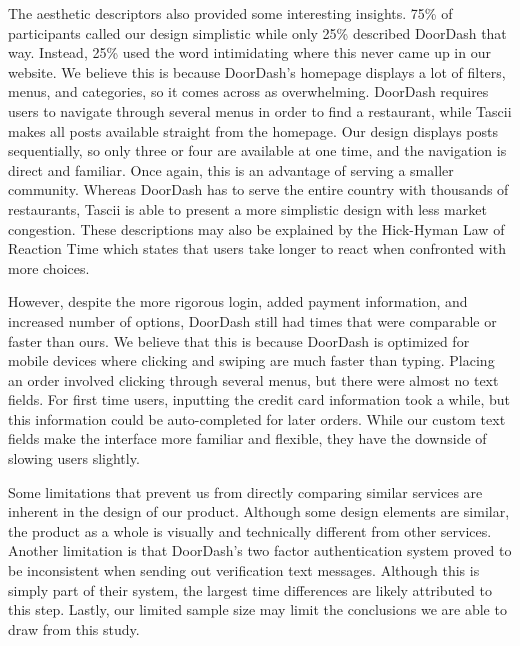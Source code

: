 The aesthetic descriptors also provided some interesting insights. 75\% of participants called our design simplistic while only 25\% described DoorDash that way. Instead, 25\% used the word intimidating where this never came up in our website. We believe this is because DoorDash's homepage displays a lot of filters, menus, and categories, so it comes across as overwhelming. DoorDash requires users to navigate through several menus in order to find a restaurant, while Tascii makes all posts available straight from the homepage. Our design displays posts sequentially, so only three or four are available at one time, and the navigation is direct and familiar. Once again, this is an advantage of serving a smaller community. Whereas DoorDash has to serve the entire country with thousands of restaurants, Tascii is able to present a more simplistic design with less market congestion. These descriptions may also be explained by the Hick-Hyman Law of Reaction Time which states that users take longer to react when confronted with more choices. 

However, despite the more rigorous login, added payment information, and increased number of options, DoorDash still had times that were comparable or faster than ours. We believe that this is because DoorDash is optimized for mobile devices where clicking and swiping are much faster than typing. Placing an order involved clicking through several menus, but there were almost no text fields. For first time users, inputting the credit card information took a while, but this information could be auto-completed for later orders. While our custom text fields make the interface more familiar and flexible, they have the downside of slowing users slightly.
	
Some limitations that prevent us from directly comparing similar services are inherent in the design of our product. Although some design elements are similar, the product as a whole is visually and technically different from other services. Another limitation is that DoorDash’s two factor authentication system proved to be inconsistent when sending out verification text messages. Although this is simply part of their system, the largest time differences are likely attributed to this step. Lastly, our limited sample size may limit the conclusions we are able to draw from this study.

